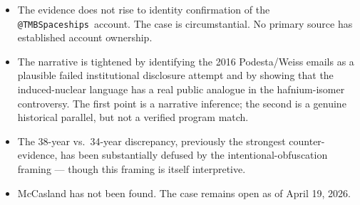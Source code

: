\documentclass[11pt]{article}
\makeatletter
\newcommand{\account}{\texttt{@TMBSpaceships}}
\makeatother
\begin{document}
\begin{itemize}
  \item The evidence does not rise to identity confirmation of the \account\ account. The case is circumstantial. No primary source has established account ownership.

  \item The narrative is tightened by identifying the 2016 Podesta/Weiss emails as a plausible failed institutional disclosure attempt and by showing that the induced-nuclear language has a real public analogue in the hafnium-isomer controversy. The first point is a narrative inference; the second is a genuine historical parallel, but not a verified program match.

  \item The 38-year vs.\ 34-year discrepancy, previously the strongest counter-evidence, has been substantially defused by the intentional-obfuscation framing — though this framing is itself interpretive.

  \item McCasland has not been found. The case remains open as of April 19, 2026.
\end{itemize}
\end{document}

